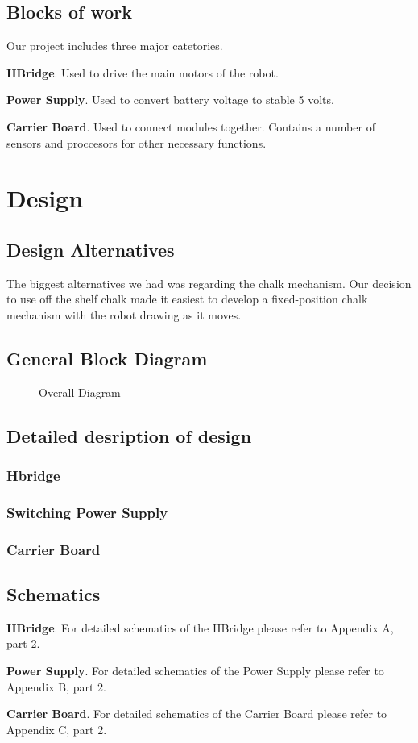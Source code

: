 \documentclass[12pt]{article}
\newcommand{\figuremine}[2]{
\begin{figure}[H]
\noindent\makebox[\textwidth]{
 \texttt{[image: \#1]}}
 \caption{#2}
\end{figure}
}
\begin{document}
\subsection{Blocks of work}
 Our project includes three major catetories. 
 \begin{description}
  \item{\bf HBridge}. Used to drive the main motors of the robot. 
  \item{\bf Power Supply}. Used to convert battery voltage to stable 5 volts.
  \item{\bf Carrier Board}. Used to connect modules together. Contains a number of sensors and proccesors for other necessary functions.
\end{description}

\section{Design}
\subsection{Design Alternatives}
The biggest alternatives we had was regarding the chalk mechanism. Our decision to use off the shelf chalk made it easiest to develop a fixed-position chalk mechanism with the robot drawing as it moves. 
\subsection{General Block Diagram}
\figuremine{../Proposal/Block_Diagram.png}{Overall Diagram}

\subsection{Detailed desription of design}
 \subsubsection{Hbridge}

\subsubsection{Switching Power Supply}


\subsubsection{Carrier Board}
\subsection{Schematics}
 \begin{description}
  \item{\bf HBridge}. For detailed schematics of the HBridge please refer to Appendix A, part 2. 
  \item{\bf Power Supply}. For detailed schematics of the Power Supply please refer to Appendix B, part 2.
  \item{\bf Carrier Board}. For detailed schematics of the Carrier Board please refer to Appendix C, part 2.
\end{description}
\end{document}
